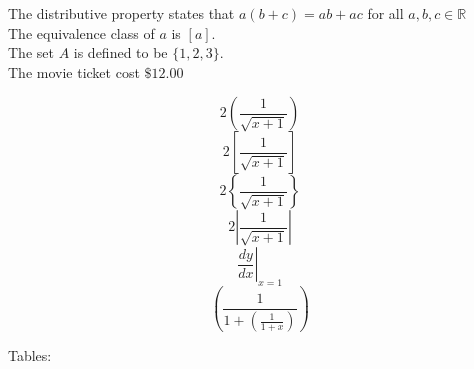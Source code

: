 \documentclass[18px]{article}
\begin{document}
The distributive property states that $a(b+c)=ab+ac$ for all $a,b,c \in \mathbb{R}$\\[6pt]
The equivalence class of $a$ is $[a]$.\\[6pt]
The set $A$ is defined to be $\{1,2,3\}$.\\[6pt]
The movie ticket cost $\$12.00$

$$2\left(\frac{1}{\sqrt{x + 1}}\right)$$
$$2\left[\frac{1}{\sqrt{x + 1}}\right]$$
$$2\left\{\frac{1}{\sqrt{x + 1}}\right\}$$
$$2\left|\frac{1}{\sqrt{x + 1}}\right|$$
$$\left.\frac{dy}{dx}\right|_{x=1}$$
$$\left(\frac{1}{1 + \left(\frac{1}{1+x}\right)} \right)$$

Tables:\\
\end{document}
